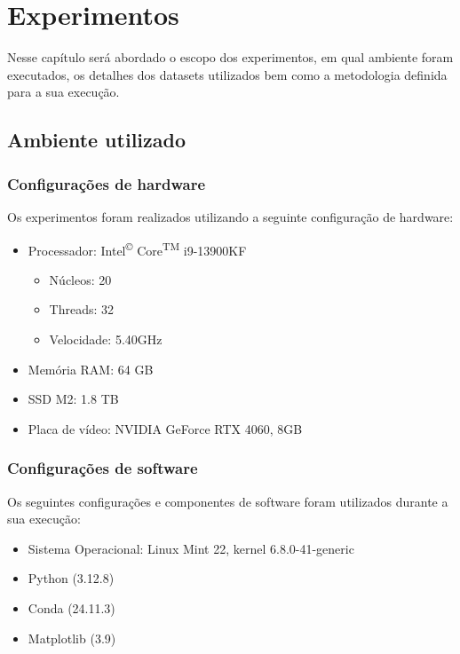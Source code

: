 \chapter{Experimentos}\label{cap:experimentos}

Nesse capítulo será abordado o escopo dos experimentos, em qual ambiente foram executados, os detalhes dos datasets utilizados bem como a metodologia definida para a sua execução. 

\section{Ambiente utilizado}


\subsection{Configurações de hardware}

Os experimentos foram realizados utilizando a seguinte configuração de hardware:

\begin{itemize}
    \item Processador: Intel\textsuperscript{\tiny{\copyright}} Core\textsuperscript{\tiny{TM}} i9-13900KF 
    \begin{itemize}
        \item Núcleos: 20
        \item Threads: 32
        \item Velocidade: 5.40GHz
    \end{itemize}
    \item Memória RAM: 64 GB
    \item SSD M2: 1.8 TB
    \item Placa de vídeo: NVIDIA GeForce RTX 4060, 8GB
\end{itemize}

\subsection{Configurações de software}

Os seguintes configurações e componentes de software foram utilizados durante a sua execução:

\begin{itemize}
    \item Sistema Operacional: Linux Mint 22, kernel 6.8.0-41-generic
    \item Python (3.12.8) 
    \item Conda (24.11.3) 
    \item Matplotlib (3.9)
\end{itemize}

